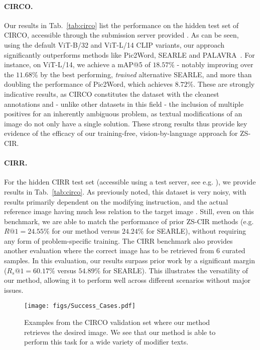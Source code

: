 \documentclass{article} \usepackage{iclr2024_conference,times}
\begin{document}
\paragraph{CIRCO.} 
Our results in Tab.~\ref{tab:circo} list the performance on the hidden test set of CIRCO, accessible through the submission server provided \cite{searle}. 
As can be seen, using the default ViT-B/32 and ViT-L/14 CLIP variants, our approach significantly outperforms methods like Pic2Word, SEARLE and PALAVRA~\citep{palavra}. 
For instance, on ViT-L/14, we achieve a mAP@5 of $18.57\%$ - notably improving over the $11.68$\% by the best performing, \textit{trained} alternative SEARLE, and more than doubling the performance of Pic2Word, which achieves $8.72\%$.
These are strongly indicative results, as CIRCO constitutes the dataset with the cleanest annotations and - unlike other datasets in this field - the inclusion of multiple positives for an inherently ambiguous problem, as textual modifications of an image do not only have a single solution.
These strong results thus provide key evidence of the efficacy of our training-free, vision-by-language approach for ZS-CIR.

\vspace{-5pt}
\paragraph{CIRR.} For the hidden CIRR test set (accessible using a test server, see e.g. \citet{cirr}), we provide results in Tab.~\ref{tab:circo}. 
As previously noted, this dataset is very noisy, with results primarily dependent on the modifying instruction, and the actual reference image having much less relation to the target image \citep{pic2word,searle}.
Still, even on this benchmark, we are able to match the performance of prior ZS-CIR methods (e.g. $R@1=24.55\%$ for our method versus $24.24\%$ for SEARLE), without requiring any form of problem-specific training. The CIRR benchmark also provides another evaluation where the correct image has to be retrieved from 6 curated samples. In this evaluation, our results surpass prior work by a significant margin ($R_s@1=60.17\%$ versus $54.89\%$ for SEARLE).
This illustrates the versatility of our method, allowing it to perform well across different scenarios without major issues.

\begin{figure}[t]
    \centering
    \texttt{[image: figs/Success\_Cases.pdf]}
    \vspace{-10pt}
    \caption{Examples from the CIRCO validation set where our method retrieves the desired image. We see that our method is able to perform this task for a wide variety of modifier texts.}
    \label{fig:success}
\vspace{-5pt}
\end{figure} 
\vspace{-5pt}
\end{document}
